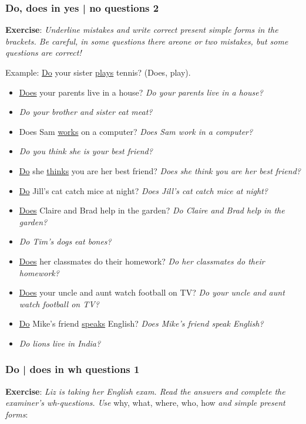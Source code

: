 \subsubsection{Do, does in yes | no questions 2}

\textbf{Exercise}: \textit{Underline mistakes and write correct present simple forms in the brackets. Be careful, in some questions there areone or two mistakes, but some questions are correct!}

Example:
\underline{Do} your sister \underline{plays} tennis? (Does, play).

\begin{itemize}

\item \underline{Does} your parents live in a house? \textit{Do your parents live in a house?}
\item \textit{Do your brother and sister eat meat?}
\item Does Sam \underline{works} on a computer? \textit{Does Sam work in a computer?}
\item \textit{Do you think she is your best friend?}
\item \underline{Do} she \underline{thinks} you are her best friend? \textit{Does she think you are her best friend?} 
\item \underline{Do} Jill's cat catch mice at night? \textit{Does Jill's cat catch mice at night?}
\item \underline{Does} Claire and Brad help in the garden? \textit{Do Claire and Brad help in the garden?}
\item \textit{Do Tim's dogs eat bones?}
\item \underline{Does} her classmates do their homework? \textit{Do her classmates do their homework?}
\item \underline{Does} your uncle and aunt watch football on TV? \textit{Do your uncle and aunt watch football on TV?}
\item \underline{Do} Mike's friend \underline{speaks} English? \textit{Does Mike's friend speak English?}
\item \textit{Do lions live in India?}

\end{itemize}

\subsubsection{Do | does in wh questions 1}

\textbf{Exercise}: \textit{Liz is taking her English exam. Read the answers and complete the examiner's wh-questions. Use} why, what, where, who, how \textit{and simple present forms}:

